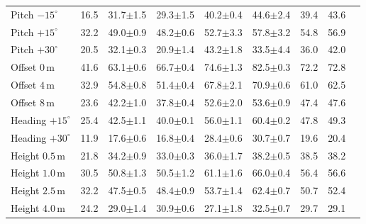 \begin{table}[t]
\begin{tabular}{@{}lcccccccc@{}}
Pitch $-15^\circ$ & 16.5 & 31.7{\scriptsize$\pm$1.5} & 29.3{\scriptsize$\pm$1.5} & 40.2{\scriptsize$\pm$0.4} & 44.6{\scriptsize$\pm$2.4} & 39.4 & 43.6 \\
Pitch $+15^\circ$ & 32.2 & 49.0{\scriptsize$\pm$0.9} & 48.2{\scriptsize$\pm$0.6} & 52.7{\scriptsize$\pm$3.3} & 57.8{\scriptsize$\pm$3.2} & 54.8 & 56.9 \\
Pitch $+30^\circ$ & 20.5 & 32.1{\scriptsize$\pm$0.3} & 20.9{\scriptsize$\pm$1.4} & 43.2{\scriptsize$\pm$1.8} & 33.5{\scriptsize$\pm$4.4} & 36.0 & 42.0 \\
\addlinespace[2pt]
Offset $0$\,m & 41.6 & 63.1{\scriptsize$\pm$0.6} & 66.7{\scriptsize$\pm$0.4} & 74.6{\scriptsize$\pm$1.3} & 82.5{\scriptsize$\pm$0.3} & 72.2 & 72.8 \\
Offset $4$\,m & 32.9 & 54.8{\scriptsize$\pm$0.8} & 51.4{\scriptsize$\pm$0.4} & 67.8{\scriptsize$\pm$2.1} & 70.9{\scriptsize$\pm$0.6} & 61.0 & 62.5 \\
Offset $8$\,m & 23.6 & 42.2{\scriptsize$\pm$1.0} & 37.8{\scriptsize$\pm$0.4} & 52.6{\scriptsize$\pm$2.0} & 53.6{\scriptsize$\pm$0.9} & 47.4 & 47.6 \\
\addlinespace[2pt]
Heading $+15^\circ$ & 25.4 & 42.5{\scriptsize$\pm$1.1} & 40.0{\scriptsize$\pm$0.1} & 56.0{\scriptsize$\pm$1.1} & 60.4{\scriptsize$\pm$0.2} & 47.8 & 49.3 \\
Heading $+30^\circ$ & 11.9 & 17.6{\scriptsize$\pm$0.6} & 16.8{\scriptsize$\pm$0.4} & 28.4{\scriptsize$\pm$0.6} & 30.7{\scriptsize$\pm$0.7} & 19.6 & 20.4 \\
\addlinespace[2pt]
Height $0.5$\,m & 21.8 & 34.2{\scriptsize$\pm$0.9} & 33.0{\scriptsize$\pm$0.3} & 36.0{\scriptsize$\pm$1.7} & 38.2{\scriptsize$\pm$0.5} & 38.5 & 38.2 \\
Height $1.0$\,m & 30.5 & 50.8{\scriptsize$\pm$1.3} & 50.5{\scriptsize$\pm$1.2} & 61.1{\scriptsize$\pm$1.6} & 66.0{\scriptsize$\pm$0.4} & 56.4 & 56.6 \\
Height $2.5$\,m & 32.2 & 47.5{\scriptsize$\pm$0.5} & 48.4{\scriptsize$\pm$0.9} & 53.7{\scriptsize$\pm$1.4} & 62.4{\scriptsize$\pm$0.7} & 50.7 & 52.4 \\
Height $4.0$\,m & 24.2 & 29.0{\scriptsize$\pm$1.4} & 30.9{\scriptsize$\pm$0.6} & 27.1{\scriptsize$\pm$1.8} & 32.5{\scriptsize$\pm$0.7} & 29.7 & 29.1 \\
\bottomrule
\end{tabular}
\end{table}